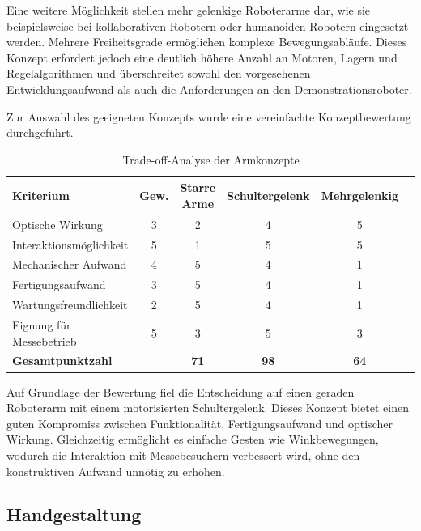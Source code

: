 Eine weitere Möglichkeit stellen mehr gelenkige Roboterarme dar, wie sie beispielsweise bei kollaborativen Robotern oder humanoiden Robotern eingesetzt werden. Mehrere Freiheitsgrade ermöglichen komplexe Bewegungsabläufe. Dieses Konzept erfordert jedoch eine deutlich höhere Anzahl an Motoren, Lagern und Regelalgorithmen und überschreitet sowohl den vorgesehenen Entwicklungsaufwand als auch die Anforderungen an den Demonstrationsroboter.

Zur Auswahl des geeigneten Konzepts wurde eine vereinfachte Konzeptbewertung durchgeführt.

\begin{table}[H]
	\centering
	\caption{Trade-off-Analyse der Armkonzepte}
	\label{tab:tradeoff_arme}
	\renewcommand{\arraystretch}{1.2}
	\begin{tabular}{lccccc}
		\toprule
		\textbf{Kriterium} & \textbf{Gew.} &
		\textbf{Starre Arme} &
		\textbf{Schultergelenk} &
		\textbf{Mehrgelenkig} \\
		\midrule
		Optische Wirkung          & 3 & 2 & 4 & 5 \\
		Interaktionsmöglichkeit   & 5 & 1 & 5 & 5 \\
		Mechanischer Aufwand      & 4 & 5 & 4 & 1 \\
		
		Fertigungsaufwand         & 3 & 5 & 4 & 1 \\
		Wartungsfreundlichkeit    & 2 & 5 & 4 & 1 \\
		Eignung für Messebetrieb  & 5 & 3 & 5 & 3 \\
		\midrule
		\textbf{Gesamtpunktzahl} &
		&
		\textbf{71} &
		\textbf{98} &
		\textbf{64} \\
		\bottomrule
	\end{tabular}
\end{table}


Auf Grundlage der Bewertung fiel die Entscheidung auf einen geraden Roboterarm mit einem motorisierten Schultergelenk. Dieses Konzept bietet einen guten Kompromiss zwischen Funktionalität, Fertigungsaufwand und optischer Wirkung. Gleichzeitig ermöglicht es einfache Gesten wie Winkbewegungen, wodurch die Interaktion mit Messebesuchern verbessert wird, ohne den konstruktiven Aufwand unnötig zu erhöhen.


\subsection*{Handgestaltung}

